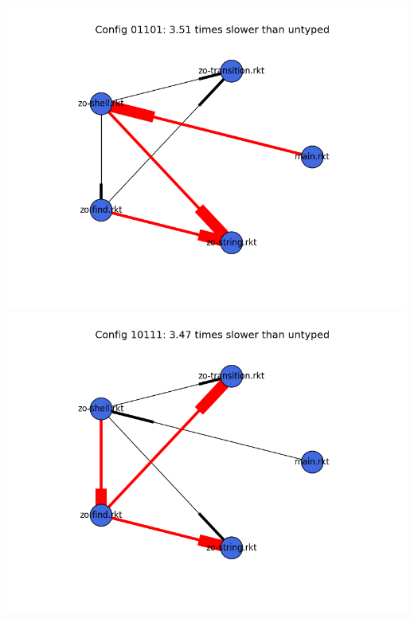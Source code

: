 \documentclass{article}
\begin{document}
\begin{itemize}
\includegraphics[width=\textwidth]{zordoz-module-graph-01101.png}
\includegraphics[width=\textwidth]{zordoz-module-graph-10111.png}
\end{itemize}
\end{document}
